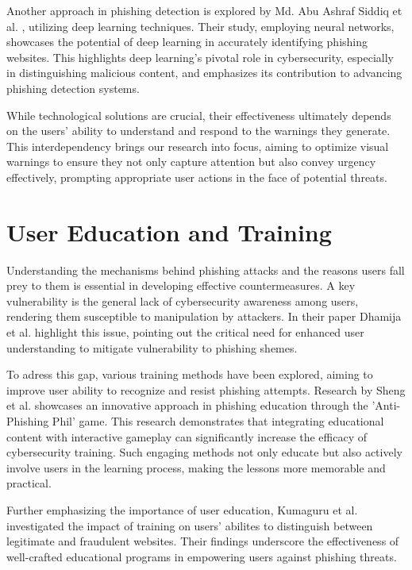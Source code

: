 \documentclass[
  a4paper,  %
  twoside,  %
  bibliography=totoc,
  headsepline,
  cleardoublepage=empty,
  parskip=half,
  draft=false
]{scrbook}
\begin{document}
Another approach in phishing detection is explored by Md. Abu Ashraf Siddiq et al. \cite{siddiq}, utilizing deep learning techniques. Their study, employing neural networks, showcases the potential of deep learning in accurately identifying phishing websites. This highlights deep learning's pivotal role in cybersecurity, especially in distinguishing malicious content, and emphasizes its contribution to advancing phishing detection systems.

While technological solutions are crucial, their effectiveness ultimately depends on the users' ability to understand and respond to the warnings they generate. This interdependency brings our research into focus, aiming to optimize visual warnings to ensure they not only capture attention but also convey urgency effectively, prompting appropriate user actions in the face of potential threats.

\section{User Education and Training}
Understanding the mechanisms behind phishing attacks and the reasons users fall prey to them is essential in developing effective countermeasures. A key vulnerability is the general lack of cybersecurity awareness among users, rendering them susceptible to manipulation by attackers. In their paper Dhamija et al. \cite{dhamija} highlight this issue, pointing out the critical need for enhanced user understanding to mitigate vulnerability to phishing shemes. 

To adress this gap, various training methods have been explored, aiming to improve user ability to recognize and resist phishing attempts. Research by Sheng et al. \cite{sheng} showcases an innovative approach in phishing education through the 'Anti-Phishing Phil' game. This research demonstrates that integrating educational content with interactive gameplay can significantly increase the efficacy of cybersecurity training. Such engaging methods not only educate but also actively involve users in the learning process, making the lessons more memorable and practical. 

Further emphasizing the importance of user education, Kumaguru et al. \cite{kumaraguru} investigated the impact of training on users' abilites to distinguish between legitimate and fraudulent websites. Their findings underscore the effectiveness of well-crafted educational programs in empowering users against phishing threats. 
\end{document}
